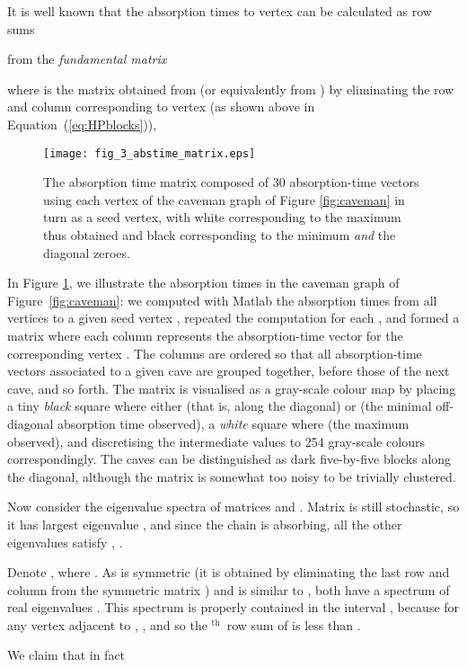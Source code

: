 \documentclass{article}
\newcommand{\superscript}[1]{\ensuremath{^\textrm{#1}}}
\renewcommand{\th}{\superscript{th}}
\begin{document}
It is well known that the absorption times to vertex 
can be calculated
as row sums

from the {\em fundamental matrix}

where  is the matrix obtained from  (or equivalently from )
by eliminating the row and column corresponding to vertex 
(as shown above in Equation~(\ref{eq:HPblocks})),

\begin{figure}
\centerline{\texttt{[image: fig\_3\_abstime\_matrix.eps]}}
\caption{The absorption time matrix composed of 30 absorption-time
  vectors using each vertex of the caveman graph of Figure
  \ref{fig:caveman} in turn as a seed vertex, with white corresponding
  to the maximum  thus obtained and black corresponding to
  the minimum  \emph{and} the diagonal zeroes.}
\label{fig:caveman_abstime}
\end{figure}

In Figure \ref{fig:caveman_abstime}, we illustrate the absorption
times in the caveman graph of Figure~\ref{fig:caveman}: we computed
with Matlab the absorption times from all vertices to a given seed vertex
, repeated the computation for each , and formed a matrix
where each column represents the absorption-time vector for the
corresponding vertex .
The columns are ordered so that all absorption-time vectors associated
to a given cave are grouped together, before those of the next cave,
and so forth. The matrix is visualised as a gray-scale colour map by
placing a tiny \emph{black} square where either  (that is, along
the diagonal) or  (the minimal off-diagonal absorption
time observed), a \emph{white} square where 
(the maximum observed), and discretising the
intermediate values to 254 gray-scale colours correspondingly. The
caves can be distinguished as dark five-by-five blocks along the diagonal,
although the matrix is somewhat too noisy to be trivially clustered.

Now consider the eigenvalue spectra of matrices  and .
Matrix  is still stochastic, so it has largest eigenvalue
, and since the chain is absorbing, all the other
eigenvalues satisfy , .

Denote , where . As  is symmetric (it is obtained by
eliminating the last row and column from the symmetric matrix )
and  is similar to , both have a spectrum of
real eigenvalues .  This spectrum is properly contained in the
interval , because for any vertex  adjacent to ,
, and so the \th\ row sum of  is less than .

We claim that in fact 
  
\end{document}
